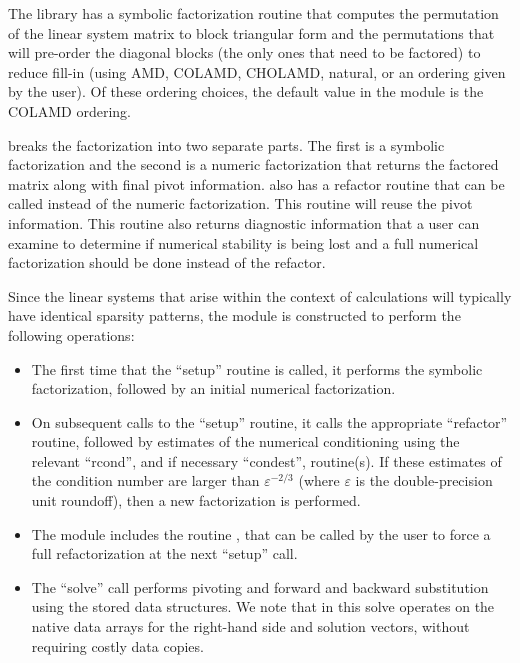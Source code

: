 The {\klu} library has a symbolic factorization routine that computes
the permutation of the linear system matrix to block triangular form
and the permutations that will pre-order the diagonal blocks (the only
ones that need to be factored) to reduce fill-in (using AMD, COLAMD,
CHOLAMD, natural, or an ordering given by the user).  Of these
ordering choices, the default value in the {\sunlinsolklu} 
module is the COLAMD ordering.

{\klu} breaks the factorization into two separate parts.  The first is
a symbolic factorization and the second is a numeric factorization
that returns the factored matrix along with final pivot information.   
{\klu} also has a refactor routine that can be called instead of the numeric 
factorization.  This routine will reuse the pivot information.  This routine 
also returns diagnostic information that a user can examine to determine if 
numerical stability is being lost and a full numerical factorization should 
be done instead of the refactor.

Since the linear systems that arise within the context of {\sundials}
calculations will typically have identical sparsity patterns, the
{\sunlinsolklu} module is constructed to perform the
following operations:
\begin{itemize}
\item The first time that the ``setup'' routine is called, it
  performs the symbolic factorization, followed by an initial
  numerical factorization.  
\item On subsequent calls to the ``setup'' routine, it calls the
  appropriate {\klu} ``refactor'' routine, followed by estimates of
  the numerical conditioning using the relevant ``rcond'', and if
  necessary ``condest'', routine(s).  If these estimates of the
  condition number are larger than $\varepsilon^{-2/3}$ (where
  $\varepsilon$ is the double-precision unit roundoff), then a new
  factorization is performed.
\item The module includes the routine , that 
  can be called by the user to force a full refactorization at the
  next ``setup'' call. 
\item The ``solve'' call performs pivoting and forward and
  backward substitution using the stored {\klu} data structures.  We
  note that in this solve {\klu} operates on the native data arrays
  for the right-hand side and solution vectors, without requiring
  costly data copies.
\end{itemize}


